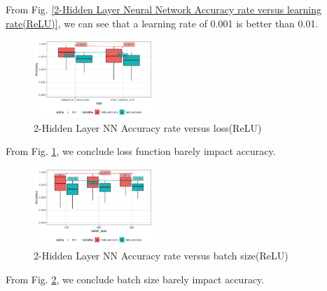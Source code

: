 \documentclass[conference]{IEEEtran}
\begin{document}
From Fig. \ref{2-Hidden Layer Neural Network Accuracy rate versus learning rate(ReLU)}, we can see that a learning rate of 0.001 is better than 0.01.
\begin{figure}[htbp]
\centerline{\includegraphics[width=0.4\textwidth]{figure/2-Hidden Layer Neural Network Accuracy rate versus loss.png}}
\caption{2-Hidden Layer NN Accuracy rate versus loss(ReLU)}
\label{2-Hidden Layer Neural Network Accuracy rate versus loss(ReLU)}
\end{figure}
From Fig. \ref{2-Hidden Layer Neural Network Accuracy rate versus loss(ReLU)}, we conclude loss function barely impact accuracy.
\begin{figure}[htbp]
\centerline{\includegraphics[width=0.4\textwidth]{figure/2-Hidden Layer Neural Network Accuracy rate versus batch_size.png}}
\caption{2-Hidden Layer NN Accuracy rate versus batch size(ReLU)}
\label{2-Hidden Layer Neural Network Accuracy rate versus batch size(ReLU)}
\end{figure}
From Fig. \ref{2-Hidden Layer Neural Network Accuracy rate versus batch size(ReLU)}, we conclude batch size barely impact accuracy.
\end{document}
